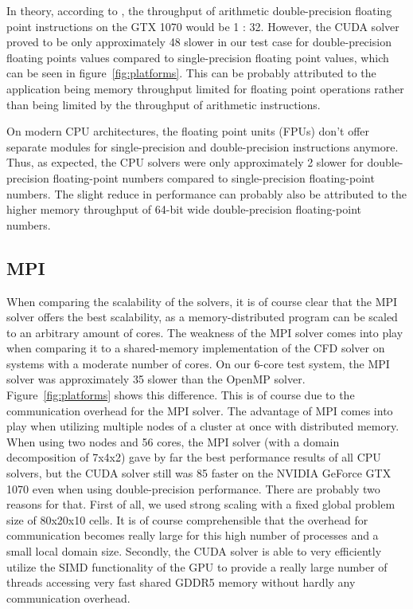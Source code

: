 \documentclass{article}%
\begin{document}
In theory, according to \cite{cuda-guide}, the throughput of arithmetic double-precision floating point instructions on the GTX 1070 would be 1 : 32. However, the CUDA solver proved to be only approximately 48\text{\%} slower in our test case for double-precision floating points values compared to single-precision floating point values, which can be seen in figure~\ref{fig:platforms}. This can be probably attributed to the application being memory throughput limited for floating point operations rather than being limited by the throughput of arithmetic instructions.

On modern CPU architectures, the floating point units (FPUs) don’t offer separate modules for single-precision and double-precision instructions anymore. Thus, as expected, the CPU solvers were only approximately 2\text{\%} slower for double-precision floating-point numbers compared to single-precision floating-point numbers. The slight reduce in performance can probably also be attributed to the higher memory throughput of 64-bit wide double-precision floating-point numbers.

\subsection{MPI}
When comparing the scalability of the solvers, it is of course clear that the MPI solver offers the best scalability, as a memory-distributed program can be scaled to an arbitrary amount of cores. The weakness of the MPI solver comes into play when comparing it to a shared-memory implementation of the CFD solver on systems with a moderate number of cores. On our 6-core test system, the MPI solver was approximately 35\text{\%} slower than the OpenMP solver. Figure~\ref{fig:platforms} shows this difference. This is of course due to the communication overhead for the MPI solver. The advantage of MPI comes into play when utilizing multiple nodes of a cluster at once with distributed memory.
When using two nodes and 56 cores, the MPI solver (with a domain decomposition of 7x4x2) gave by far the best performance results of all CPU solvers, but the CUDA solver still was 85\text{\%} faster on the NVIDIA GeForce GTX 1070 even when using double-precision performance. There are probably two reasons for that. First of all, we used strong scaling with a fixed global problem size of 80x20x10 cells. It is of course comprehensible that the overhead for communication becomes really large for this high number of processes and a small local domain size. Secondly, the CUDA solver is able to very efficiently utilize the SIMD functionality of the GPU to provide a really large number of threads accessing very fast shared GDDR5 memory without hardly any communication overhead.
\end{document}
